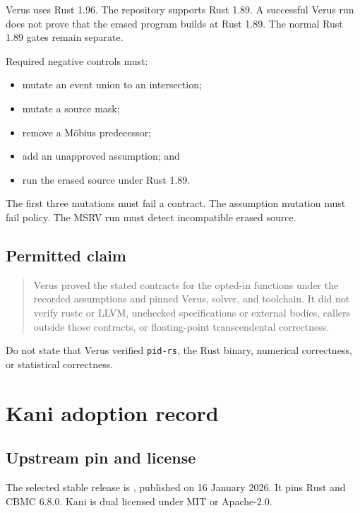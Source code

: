 \documentclass[11pt]{article}
\begin{document}
Verus uses Rust 1.96.  The repository supports Rust 1.89.  A successful Verus run does not prove
that the erased program builds at Rust 1.89.  The normal Rust 1.89 gates remain separate.

Required negative controls must:
\begin{itemize}[leftmargin=*]
  \item mutate an event union to an intersection;
  \item mutate a source mask;
  \item remove a M{\"o}bius predecessor;
  \item add an unapproved assumption; and
  \item run the erased source under Rust 1.89.
\end{itemize}
The first three mutations must fail a contract.  The assumption mutation must fail policy.  The
MSRV run must detect incompatible erased source.

\subsection{Permitted claim}

\begin{quote}
Verus proved the stated contracts for the opted-in functions under the recorded assumptions and
pinned Verus, solver, and toolchain.  It did not verify rustc or LLVM, unchecked specifications or
external bodies, callers outside those contracts, or floating-point transcendental correctness.
\end{quote}

Do not state that Verus verified \texttt{pid-rs}, the Rust binary, numerical correctness, or
statistical correctness.

\section{Kani adoption record}

\subsection{Upstream pin and license}

The selected stable release is
\href{https://github.com/model-checking/kani/releases/tag/kani-0.67.0}{},
published on 16 January 2026.  It pins Rust  and CBMC 6.8.0.
Kani is dual licensed under MIT or Apache-2.0.
\end{document}
